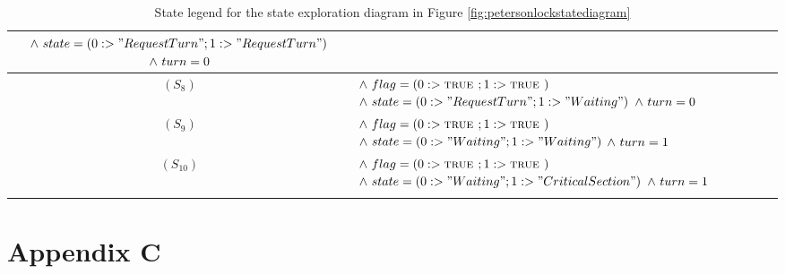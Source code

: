 \documentclass[fleqn]{tukseminar}
\begin{document}
\begin{center}
\begin{longtable}{ |c|p{10cm}| }
													$\land \  state = (0 :> "RequestTurn" ; 1 :> "RequestTurn")$\newline
													$\land \  turn = 0$  \\ \hline
							\pb $(S_8)$   & $\land \  flag = (0 :> \mbox{\textsc{true }} ; 1 :> \mbox{\textsc{true }})$\newline
													$\land \  state = (0 :> "RequestTurn" ; 1 :> "Waiting")$\newline
													$\land \  turn = 0$  \\ \hline
							\pb $(S_9)$   & $\land \  flag = (0 :> \mbox{\textsc{true }} ; 1 :> \mbox{\textsc{true }})$\newline
													$\land \  state = (0 :> "Waiting" ; 1 :> "Waiting")$\newline
													$\land \  turn = 1$  \\ \hline
							\pb $(S_{10})$   & $\land \  flag = (0 :> \mbox{\textsc{true }} ; 1 :> \mbox{\textsc{true }})$\newline
													$\land \  state = (0 :> "Waiting" ; 1 :> "CriticalSection")$\newline
													$\land \  turn = 1$  \\ \hline
							
						\hline
						\caption{State legend for the state exploration diagram in Figure \ref{fig:petersonlockstatediagram}}
					\end{longtable}
				\end{center}
			
			
			
		\newpage
			\section*{Appendix C}
			\label{codebase}
\end{document}
